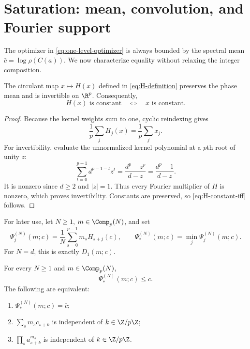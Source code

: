 \section{Saturation: mean, convolution, and Fourier support}
\label{sec:saturation}

The optimizer in \eqref{eq:one-level-optimizer} is always bounded by the
spectral mean $\bar c=\log\rho(C(a))$.  We now characterize equality without
relaxing the integer composition.

\begin{lemma}
\label{lem:H-invertible}
The circulant map $x\mapsto H(x)$ defined in \eqref{eq:H-definition}
preserves the phase mean and is invertible on $\R^p$.  Consequently,
\begin{equation}
 H(x)\text{ is constant}\quad\Longleftrightarrow\quad x\text{ is constant}.
 \label{eq:H-constant-iff}
\end{equation}
\end{lemma}

\begin{proof}
Because the kernel weights sum to one, cyclic reindexing gives
\[
 \frac1p\sum_jH_j(x)=\frac1p\sum_jx_j.
\]
For invertibility, evaluate the unnormalized kernel polynomial at a $p$th
root of unity $z$:
\begin{equation}
 \sum_{t=0}^{p-1}d^{p-1-t}z^t
 =\frac{d^p-z^p}{d-z}=\frac{d^p-1}{d-z}.
 \label{eq:H-multiplier}
\end{equation}
It is nonzero since $d\geq2$ and $|z|=1$.  Thus every Fourier multiplier of
$H$ is nonzero, which proves invertibility.  Constants are preserved, so
\eqref{eq:H-constant-iff} follows.
\end{proof}

For later use, let $N\geq1$, $m\in\Comp_p(N)$, and set
\begin{equation}
 \Psi_j^{(N)}(m;c)=\frac1N\sum_{s=0}^{p-1}m_sH_{s+j}(c),
 \qquad
 \Psi_*^{(N)}(m;c)=\min_j\Psi_j^{(N)}(m;c).
 \label{eq:Psi-definition}
\end{equation}
For $N=d$, this is exactly $D_1(m;c)$.

\begin{theorem}
\label{thm:saturation}
For every $N\geq1$ and $m\in\Comp_p(N)$,
\begin{equation}
 \Psi_*^{(N)}(m;c)\leq\bar c.
 \label{eq:spectral-mean-bound}
\end{equation}
The following are equivalent:
\begin{enumerate}[label=(\alph*)]
  \item $\Psi_*^{(N)}(m;c)=\bar c$;
  \item $\sum_s m_sc_{s+k}$ is independent of $k\in\Z/p\Z$;
  \item $\prod_s a_{s+k}^{m_s}$ is independent of
  $k\in\Z/p\Z$.
\end{enumerate}
\end{theorem}

